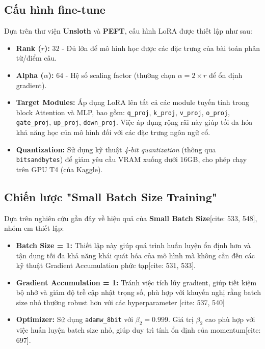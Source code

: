 \subsection{Cấu hình fine-tune}
Dựa trên thư viện \textbf{Unsloth} và \textbf{PEFT}, cấu hình LoRA được thiết lập như sau:
\begin{itemize}
    \item \textbf{Rank ($r$):} $32$ - Đủ lớn để mô hình học được các đặc trưng của bài toán phân từ/điểm câu.
    \item \textbf{Alpha ($\alpha$):} $64$ - Hệ số scaling factor (thường chọn $\alpha = 2 \times r$ để ổn định gradient).
    \item \textbf{Target Modules:} Áp dụng LoRA lên tất cả các module tuyến tính trong block Attention và MLP, bao gồm: \texttt{q_proj}, \texttt{k_proj}, \texttt{v_proj}, \texttt{o_proj}, \texttt{gate_proj}, \texttt{up_proj}, \texttt{down_proj}. Việc áp dụng rộng rãi này giúp tối đa hóa khả năng học của mô hình đối với các đặc trưng ngôn ngữ cổ.
    \item \textbf{Quantization:} Sử dụng kỹ thuật \textit{4-bit quantization} (thông qua \texttt{bitsandbytes}) để giảm yêu cầu VRAM xuống dưới 16GB, cho phép chạy trên GPU T4 (của Kaggle).
\end{itemize}

\subsection{Chiến lược "Small Batch Size Training"}
Dựa trên nghiên cứu gần đây về hiệu quả của \textbf{Small Batch Size}[cite: 533, 548], nhóm em thiết lập:
\begin{itemize}
    \item \textbf{Batch Size = 1:} Thiết lập này giúp quá trình huấn luyện ổn định hơn và tận dụng tối đa khả năng khái quát hóa của mô hình mà không cần đến các kỹ thuật Gradient Accumulation phức tạp[cite: 531, 533].
    \item \textbf{Gradient Accumulation = 1:} Tránh việc tích lũy gradient, giúp tiết kiệm bộ nhớ và giảm độ trễ cập nhật trọng số, phù hợp với khuyến nghị rằng batch size nhỏ thường robust hơn với các hyperparameter [cite: 537, 540]
    \item \textbf{Optimizer:} Sử dụng \texttt{adamw\_8bit} với $\beta_2 = 0.999$. Giá trị $\beta_2$ cao phù hợp với việc huấn luyện batch size nhỏ, giúp duy trì tính ổn định của momentum[cite: 697].
\end{itemize}

